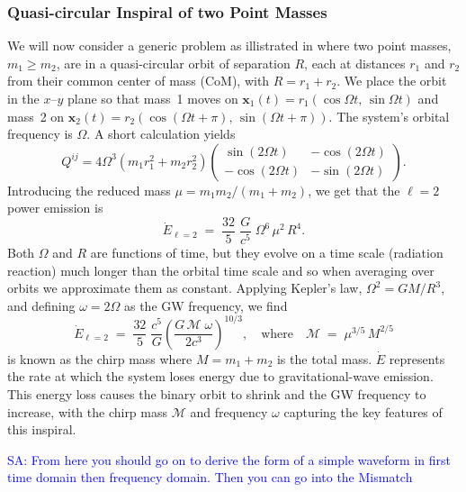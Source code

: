 \documentclass[12pt]{article}
\newcommand{\Sarp}[1]{{\textcolor{blue}{{SA: #1}} }}
\begin{document}
\subsubsection*{Quasi-circular Inspiral of two Point Masses}
\label{subsec:two_mass_example}
We will now consider a generic problem as illistrated in \cite{intoGRSarp} where two point masses, \(m_1 \ge m_2\), are in a quasi-circular orbit of separation \(R\),
each at distances \(r_1\) and \(r_2\) from their common center of mass (CoM), with
\(R = r_1 + r_2\). We place the orbit in the \(x\)--\(y\) plane so that mass~1 moves on
\(\mathbf{x}_1(t) = r_1(\cos\Omega t,\,\sin\Omega t)\) and mass~2 on
\(\mathbf{x}_2(t) = r_2(\cos(\Omega t+\pi),\,\sin(\Omega t+\pi))\). The system’s orbital
frequency is \(\Omega\). A short calculation yields
%
\begin{equation}
    Q^{ij} = 4 \Omega^3 \left(m_1 r_1^2 + m_2 r_2^2\right)
    \begin{pmatrix}
    \sin(2\Omega t) & -\cos(2\Omega t) \\
    -\cos(2\Omega t) & -\sin(2\Omega t)
    \end{pmatrix}.
\end{equation}
%
%
Introducing the reduced mass \(\mu = m_1 m_2/(m_1 + m_2)\), we get that the \(\ell=2\) power emission is
%
\begin{equation}\label{eq:E_dot_2}
\dot{E}_{\ell=2}
\;=\;
\frac{32}{5}\;\frac{G}{c^5}\;\Omega^6\,\mu^2\,R^4.
\end{equation}
Both \(\Omega\) and \(R\) are functions of time, but they evolve on a time scale (radiation reaction) much longer than the orbital time
scale and so when averaging over orbits we approximate them as constant. Applying Kepler’s law, \(\Omega^2 = GM/R^3\), and defining
\(\omega = 2\Omega\) as the GW frequency, we find
%
%
\begin{equation}
\dot{E}_{\ell=2}
\;=\;
\frac{32}{5}\;\frac{c^5}{G}
\left(\frac{G\,\mathcal{M}\;\omega}{2c^3}\right)^{10/3},
\quad
\text{where}
\quad
\mathcal{M} \;=\;\mu^{3/5}\,M^{2/5}
\label{eq:Energy}
\end{equation}
%
is known as the chirp mass where $M = m_1+m_2$ is the total mass.
%
%
$ \dot{E} $ represents the rate at which the system loses energy due to gravitational-wave emission.
This energy loss causes the binary orbit to shrink and the GW frequency to increase, 
with the chirp mass \(\mathcal{M}\) and frequency \(\omega\) capturing the key features of this inspiral.

\Sarp{From here you should go on to derive the form of a simple waveform in first time domain then frequency domain. Then you can go into the Mismatch}
\end{document}
